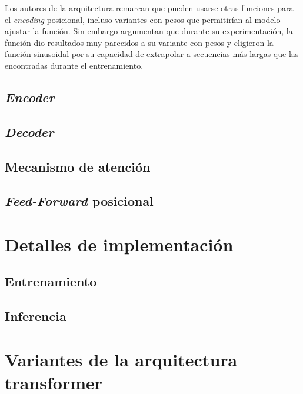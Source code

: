 Los autores de la arquitectura remarcan que pueden usarse otras funciones para el \textit{encoding} posicional, incluso variantes con pesos que permitirían al modelo ajustar la función. Sin embargo argumentan que durante su experimentación, la función dio resultados muy parecidos a su variante con pesos y eligieron la función sinusoidal por su capacidad de extrapolar a secuencias más largas que las encontradas durante el entrenamiento.

\subsection{\textit{Encoder}}
\subsection{\textit{Decoder}}
\subsection{Mecanismo de atención}
\subsection{\textit{Feed-Forward} posicional}
\section{Detalles de implementación}
\subsection{Entrenamiento}
\subsection{Inferencia}
\section{Variantes de la arquitectura transformer} \label{transfvariants}
\cite{Tay2020Sep, Lin2021Jun}
